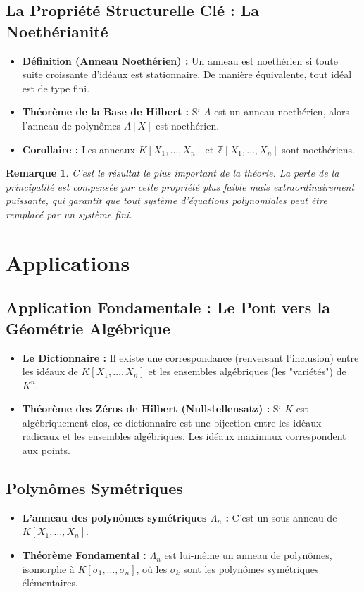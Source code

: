 \documentclass[12pt, a4paper, parskip=full]{report}
\theoremstyle{agregstyle}
\newtheorem{remark}[definition]{Remarque}
\begin{document}
\subsection{La Propriété Structurelle Clé : La Noethérianité}
\begin{itemize}
    \item \textbf{Définition (Anneau Noethérien) :} Un anneau est noethérien si toute suite croissante d'idéaux est stationnaire. De manière équivalente, tout idéal est de type fini.
    \item \textbf{Théorème de la Base de Hilbert :} Si $A$ est un anneau noethérien, alors l'anneau de polynômes $A[X]$ est noethérien.
    \item \textbf{Corollaire :} Les anneaux $K[X_1, \dots, X_n]$ et $\mathbb{Z}[X_1, \dots, X_n]$ sont noethériens.
\end{itemize}
\begin{remark}
    C'est le résultat le plus important de la théorie. La perte de la principalité est compensée par cette propriété plus faible mais extraordinairement puissante, qui garantit que tout système d'équations polynomiales peut être remplacé par un système fini.
\end{remark}

\section{Applications}

\subsection{Application Fondamentale : Le Pont vers la Géométrie Algébrique}
\begin{itemize}
    \item \textbf{Le Dictionnaire :} Il existe une correspondance (renversant l'inclusion) entre les idéaux de $K[X_1, \dots, X_n]$ et les ensembles algébriques (les "variétés") de $K^n$.
    \item \textbf{Théorème des Zéros de Hilbert (Nullstellensatz) :} Si $K$ est algébriquement clos, ce dictionnaire est une bijection entre les idéaux radicaux et les ensembles algébriques. Les idéaux maximaux correspondent aux points.
\end{itemize}

\subsection{Polynômes Symétriques}
\begin{itemize}
    \item \textbf{L'anneau des polynômes symétriques $\Lambda_n$ :} C'est un sous-anneau de $K[X_1, \dots, X_n]$.
    \item \textbf{Théorème Fondamental :} $\Lambda_n$ est lui-même un anneau de polynômes, isomorphe à $K[\sigma_1, \dots, \sigma_n]$, où les $\sigma_k$ sont les polynômes symétriques élémentaires.
\end{itemize}
\end{document}
